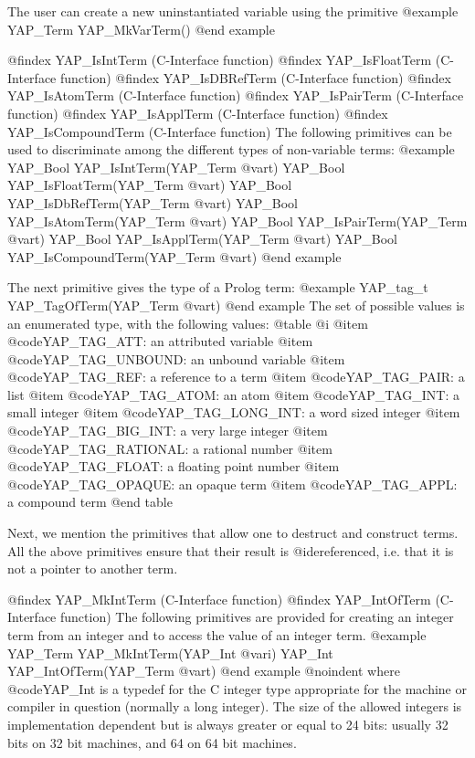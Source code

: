 {{{{{{{{The user can create a new uninstantiated variable using the primitive
@example
      YAP_Term  YAP_MkVarTerm()
@end example


@findex YAP_IsIntTerm (C-Interface function)
@findex YAP_IsFloatTerm (C-Interface function)
@findex YAP_IsDBRefTerm (C-Interface function)
@findex YAP_IsAtomTerm (C-Interface function)
@findex YAP_IsPairTerm (C-Interface function)
@findex YAP_IsApplTerm (C-Interface function)
@findex YAP_IsCompoundTerm (C-Interface function)
The following primitives can be used to discriminate among the different types
of non-variable terms:
@example
      YAP_Bool YAP_IsIntTerm(YAP_Term @var{t})
      YAP_Bool YAP_IsFloatTerm(YAP_Term @var{t})
      YAP_Bool YAP_IsDbRefTerm(YAP_Term @var{t})
      YAP_Bool YAP_IsAtomTerm(YAP_Term @var{t})
      YAP_Bool YAP_IsPairTerm(YAP_Term @var{t})
      YAP_Bool YAP_IsApplTerm(YAP_Term @var{t})
      YAP_Bool YAP_IsCompoundTerm(YAP_Term @var{t})
@end example

The next primitive gives the type of a Prolog term:
@example
      YAP_tag_t YAP_TagOfTerm(YAP_Term @var{t})
@end example
The set of possible values is an enumerated type, with the following values:
@table @i
@item  @code{YAP_TAG_ATT}: an attributed variable
@item  @code{YAP_TAG_UNBOUND}: an unbound variable
@item  @code{YAP_TAG_REF}: a reference to a term
@item  @code{YAP_TAG_PAIR}: a list
@item  @code{YAP_TAG_ATOM}: an atom
@item  @code{YAP_TAG_INT}: a small integer
@item  @code{YAP_TAG_LONG_INT}: a word sized integer
@item  @code{YAP_TAG_BIG_INT}: a very large integer
@item  @code{YAP_TAG_RATIONAL}: a rational number
@item  @code{YAP_TAG_FLOAT}: a floating point number
@item  @code{YAP_TAG_OPAQUE}: an opaque term
@item  @code{YAP_TAG_APPL}: a compound term
@end table


Next, we mention the primitives that allow one to destruct and construct
terms. All the above primitives ensure that their result is
@i{dereferenced}, i.e. that it is not a pointer to another term.

@findex YAP_MkIntTerm (C-Interface function)
@findex YAP_IntOfTerm (C-Interface function)
The following primitives are provided for creating an integer term from an
integer and to access the value of an integer term.
@example
      YAP_Term YAP_MkIntTerm(YAP_Int  @var{i})
      YAP_Int  YAP_IntOfTerm(YAP_Term @var{t})
@end example
@noindent
where @code{YAP_Int} is a typedef for the C integer type appropriate for
the machine or compiler in question (normally a long integer). The size
of the allowed integers is implementation dependent but is always
greater or equal to 24 bits: usually 32 bits on 32 bit machines, and 64
on 64 bit machines.

}}}}}}}}

